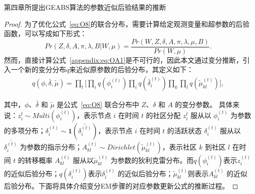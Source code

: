 




















\begin{proposition}
	第四章所提出GEABS算法的参数近似后验结果的推断
\end{proposition}

\begin{proof}
	\label{GEABS:inference}
	为了优化公式~\ref{eq:O8}的联合分布，需要计算给定观测变量和超参数的后验函数，可以写成如下形式：
	\begin{equation}
		Pr(Z,\delta, A, \pi, \lambda, B | W, \mu) =
		\frac{Pr(W, Z,\delta, A, \pi, \lambda, \mu, B)}{Pr( W, \mu)}.
		\label{appendix:eq:OA1}
	\end{equation}
	然而，直接计算公式~\ref{appendix:eq:OA1}是不可行的，因此本文通过变分推断，引入一个新的变分分布$q$来近似原参数的后验分布，其定义如下：
	\begin{equation}
		\begin{split}
			q(\phi,\bar{\delta}, \tilde{\mu}) = \prod_t \Big[ \prod_i q(\phi_i^{(t)}) \prod_i q(\bar{\delta}_i^{(t)}) \prod_k \prod_l q(\tilde{\mu}_{kl}^{(t)}) \Big],
		\end{split}
		\label{appendix:qfunc}
	\end{equation}
	
	其中，$\phi$、$\bar{\delta}$ 和 $\tilde{\mu}$ 是公式~\ref{eq:O8} 联合分布中 $Z$、$\delta$ 和 $A$ 的变分参数。  
	具体来说：$z_i^t \sim Multi(\phi_i^{(t)})$，表示节点 $i$ 在时间 $t$ 的社区分配 $z_i^t$ 服从以 $\phi_i^{(t)}$ 为参数的多项分布；$\delta_i^{(t)} \sim \mathbf{1}(\bar{\delta_i^{(t)}})$，表示节点 $i$ 在时间 $t$ 的活跃状态 $\delta_i^{(t)}$ 服从以 $\bar{\delta_i^{(t)}}$ 为参数的指示分布；$A_{kl}^{(t)} \sim Dirichlet(\tilde{\mu}_{kl}^{(t)})$，表示社区 $k$ 到社区 $l$ 在时间 $t$ 的转移概率 $A_{kl}^{(t)}$ 服从以$\tilde{\mu}_{kl}^{(t)}$ 为参数的狄利克雷分布。而$q(\phi_i^{(t)})$表示$z_i^{(t)}$ 的近似后验分布；$q(\delta_i^{(t)})$表示$\delta_i^{(t)}$ 的近似后验分布；$\tilde{\mu}_{kl}^{(t)}$则表示$A_{kl}^{(t)}$ 的近似后验分布。下面将具体介绍变分EM步骤的对应参数更新公式的推断过程。
	

\end{proof}
